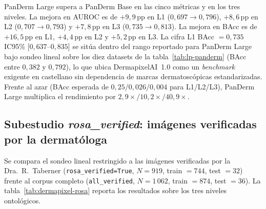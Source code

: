 PanDerm Large supera a PanDerm Base en las cinco métricas y en los
tres niveles. La mejora en AUROC es de $+9{,}9$\,pp en L1
($0{,}697 \to 0{,}796$), $+8{,}6$\,pp en L2
($0{,}707 \to 0{,}793$) y $+7{,}8$\,pp en L3
($0{,}735 \to 0{,}813$). La mejora en BAcc es de
$+16{,}5$\,pp en L1, $+4{,}4$\,pp en L2 y $+5{,}2$\,pp en
L3. La cifra L1 BAcc $= 0{,}735$ IC95\% [$0{,}637$--$0{,}835$]
se sitúa dentro del rango reportado para PanDerm Large bajo sondeo
lineal sobre los diez datasets de la
tabla~\ref{tab:lp-panderm} (BAcc entre $0{,}382$ y $0{,}792$),
lo que ubica DermapixelAI~1.0 como un \emph{benchmark} exigente
en castellano sin dependencia de marcas dermatoscópicas
estandarizadas. Frente al azar (BAcc esperada de $0{,}25 / 0{,}026 / 0{,}004$
para L1/L2/L3), PanDerm Large multiplica el rendimiento por
$2{,}9\times / 10{,}2\times / 40{,}9\times$.

\subsection*{Subestudio \emph{rosa\_verified}: imágenes verificadas
por la dermatóloga}

Se compara el sondeo lineal restringido a las imágenes verificadas
por la Dra.~R.~Taberner (\texttt{rosa\_verified=True}, $N = 919$,
train $= 744$, test $= 32$) frente al corpus completo
(\texttt{all\_verified}, $N = 1\,062$, train $= 874$, test $= 36$).
La tabla~\ref{tab:dermapixel-rosa} reporta los resultados sobre los
tres niveles ontológicos.

